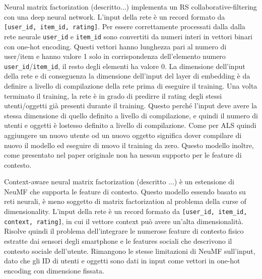 Neural matrix factorization (descritto...) implementa un RS
collaborative-filtering con una deep neural network. L'input della 
rete è un record formato da \texttt{[user\_id, item\_id, rating]}.
Per essere correttamente processati dalla dalla rete neurale \texttt{user\_id} e \texttt{item\_id} sono convertiti da numeri interi in vettori binari con one-hot encoding. Questi vettori hanno lunghezza pari al numero di 
user/item e hanno valore 1 solo in corrispondenza dell'elemento numero 
\texttt{user\_id}/\texttt{item\_id}, il resto degli elementi ha valore 0. La dimensione dell'input della rete e di conseguenza la dimensione dell'input del layer di embedding è da definire a livello di compilazione della rete prima di eseguire il training. Una volta terminato il training, la rete è in grado di predirre il rating degli stessi utenti/oggetti già presenti durante il training. Questo perché l'input deve avere la stessa dimensione di quello definito a livello di compilazione, e quindi il numero di utenti e oggetti è lostesso definito a livello di compilazione. Come per ALS quindi aggiungere un nuovo utente od un nuovo oggetto significa dover compilare di nuovo il modello ed eseguire di nuovo il training da zero. Questo modello inoltre, come presentato nel paper originale \cite{NCF} non ha nessun supporto per le feature di contesto.

Context-aware neural matrix factorization (descritto ...) è un estensione di NeuMF che supporta le feature di contesto. Questo modello essendo basato su reti neurali, è meno soggetto di matrix factorization al problema della curse of dimensionality. L'input della rete è un record formato da \texttt{[user\_id, item\_id, context, rating]}, in cui il vettore context può avere un'alta dimensionalità. Risolve quindi il problema dell'integrare le numerose feature di contesto fisico estratte dai sensori degli smartphone e le features sociali che descrivono il contesto sociale dell'utente. Rimangono le stesse limitazioni di NeuMF sull'input, dato che gli ID di utenti e oggetti sono dati in input come vettori in one-hot encoding con dimensione fissata.
